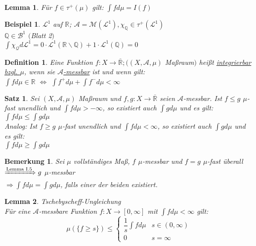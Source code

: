 \documentclass[11pt]{memoir}
\theoremstyle{changebreak}
\newtheorem{Definition}{Definition}[chapter]
\newtheorem{Bemerkung}{Bemerkung}[chapter]
\newtheorem{Beispiel}{Beispiel}[chapter]
\newtheorem{Lemma}{Lemma}[chapter]
\newtheorem{Satz}{Satz}[chapter]
\begin{document}
\begin{Lemma}
Für $f \in \tau^+ (\mu)$ gilt: $\int f d\mu = I(f)$
\end{Lemma}

\begin{Beispiel}
$\mathscr L^1$ auf $\mathbb R$; $\mathscr A = \mathscr M(\mathscr L^1), \chi_\mathbb Q \in \tau^+ (\mathscr L^1)$ \\
$\mathbb Q \in \mathscr B^1$ $($Blatt 2$)$ \\
$\int \chi_\mathscr Q d\mathscr L^1 = 0 \cdotp \mathscr L^1(\mathbb R \backslash \mathbb Q) + 1 \cdotp \mathscr L^1(\mathbb Q) = 0$
\end{Beispiel}

\begin{Definition}
Eine Funktion $f: X \rightarrow \overline{\mathbb R}; ((X, \mathscr A, \mu)$ Maßraum$)$ heißt \underline{integrierbar bzgl. $\mu$}, wenn sie \underline{$\mathscr A$-messbar} ist und wenn gilt: \\
$\int f d\mu \in \mathbb R$ $\Leftrightarrow$ $\int f^+ d\mu + \int f^- d\mu < \infty$
\end{Definition}

\begin{Satz}
Sei $(X, \mathscr A, \mu)$ Maßraum und $f, g: X \rightarrow \overline{\mathbb R}$ seien $\mathscr A$-messbar. Ist $f \leq g$ $\mu$-fast unendlich und $\int f d\mu > -\infty$, so existiert auch $\int g d\mu$ und es gilt: \\
$\int f d\mu \leq \int g d\mu$ \\
Analog:  Ist $f \geq g$ $\mu$-fast unendlich und $\int f d\mu < \infty$, so existiert auch $\int g d\mu$ und es gilt: \\
$\int f d\mu \geq \int g d\mu$
\end{Satz}

\begin{Bemerkung}
Sei $\mu$ vollständiges Maß, $f$ $\mu$-messbar und $f = g$ $\mu$-fast überall \\
$\xRightarrow{\text{Lemma I.5}} g$ $\mu$-messbar \\
$\Rightarrow \int f d\mu = \int g d\mu$, falls einer der beiden existiert.
\end{Bemerkung}

\begin{Lemma}
\emph{Tschebyscheff-Ungleichung} \\
Für eine $\mathscr A$-messbare Funktion $f: X \rightarrow [0, \infty]$ mit $\int f d\mu < \infty$ gilt: \\
\begin{equation}
	\mu(\{f \geq s\}) \leq
	\begin{cases}
		\dfrac{1}{s}\int f d\mu & s \in (0, \infty) \\
		0 & s = \infty
	\end{cases}
\end{equation}
\end{Lemma}
\end{document}
